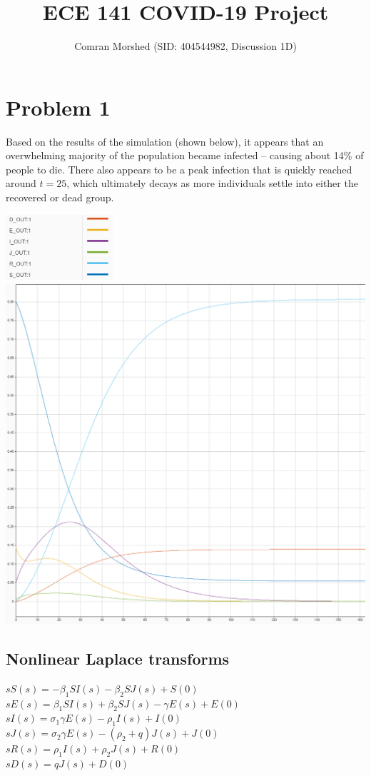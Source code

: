 \documentclass[fleqn]{article}
\begin{document}
\title{ECE 141 COVID-19 Project}
\author{Comran Morshed (SID: 404544982, Discussion 1D)}
\date{}
\maketitle

\section*{Problem 1}
Based on the results of the simulation (shown below), it appears that an overwhelming majority of the population became infected -- causing about 14\% of people to die. There also appears to be a peak infection that is quickly reached around $t=25$, which ultimately decays as more individuals settle into either the recovered or dead group.

\begin{center}
    \includegraphics[width=4cm]{outbreak_legend} \\
    \includegraphics[width=0.85\linewidth]{outbreak_graph}
\end{center}

\newpage

\subsection*{Nonlinear Laplace transforms}
\noindent
$sS(s) = -\beta_1 S I(s) - \beta_2 S J(s) + S(0)$ \\
$sE(s) = \beta_1 S I(s) + \beta_2 S J(s) - \gamma E(s) + E(0)$ \\
$sI(s) = \sigma_1 \gamma E(s) - \rho_1 I(s) + I(0)$ \\
$sJ(s) = \sigma_2 \gamma E(s) - (\rho_2 + q) J(s) + J(0)$ \\
$sR(s) = \rho_1 I(s) + \rho_2 J(s) + R(0)$ \\
$sD(s) = qJ(s) + D(0)$ \\
\end{document}
